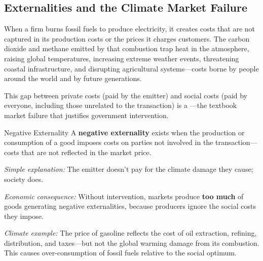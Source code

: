\subsection{Externalities and the Climate Market Failure}

When a firm burns fossil fuels to produce electricity, it creates costs that are not captured in its production costs or the prices it charges customers. The carbon dioxide and methane emitted by that combustion trap heat in the atmosphere, raising global temperatures, increasing extreme weather events, threatening coastal infrastructure, and disrupting agricultural systems---costs borne by people around the world and by future generations.

This gap between private costs (paid by the emitter) and social costs (paid by everyone, including those unrelated to the transaction) is a ---the textbook market failure that justifies government intervention.

\begin{defbox}{Negative Externality}
A \textbf{negative externality} exists when the production or consumption of a good imposes costs on parties not involved in the transaction---costs that are not reflected in the market price.

\textit{Simple explanation:} The emitter doesn't pay for the climate damage they cause; society does.

\textit{Economic consequence:} Without intervention, markets produce \textbf{too much} of goods generating negative externalities, because producers ignore the social costs they impose.

\textit{Climate example:} The price of gasoline reflects the cost of oil extraction, refining, distribution, and taxes---but not the global warming damage from its combustion. This causes over-consumption of fossil fuels relative to the social optimum.
\end{defbox}

